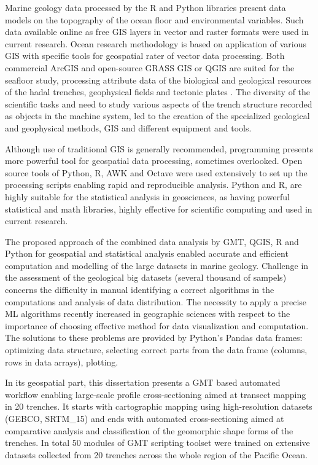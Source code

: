 \documentclass[11pt,a4paper]{report}
\begin{document}
Marine geology data processed by the R and Python libraries present data models on the topography of the ocean floor and environmental variables. Such data available online as free \ac{GIS} layers in vector and raster formats were used in current research. Ocean research methodology is based on application of various \ac{GIS} with specific tools for geospatial rater of vector data processing. Both commercial ArcGIS and open-source \ac{GRASS GIS} or \ac{QGIS} are suited for the seafloor study, processing attribute data of the biological and geological resources of the hadal trenches, geophysical fields and tectonic plates \cite{Lemenkova202016}. The diversity of the scientific tasks and need to study various aspects of the trench structure recorded as objects in the machine system, led to the creation of the specialized geological and geophysical methods, \ac{GIS} and different equipment and tools. 

Although use of traditional GIS is generally recommended, programming presents more powerful tool for geospatial data processing, sometimes overlooked. Open source tools of Python, R, AWK and Octave were used extensively to set up the processing scripts enabling rapid and reproducible analysis. Python and R, are highly suitable for the statistical analysis in geosciences, as having powerful statistical and math libraries, highly effective for scientific computing and used in current research. 

The proposed approach of the combined data analysis by \ac{GMT}, \ac{QGIS}, R and Python for geospatial and statistical analysis enabled accurate and efficient computation and modelling of the large datasets in marine geology. Challenge in the assessment of the geological big datasets (several thousand of sampels) concerns the difficulty in manual identifying a correct algorithms in the computations and analysis of data distribution. The necessity to apply a precise \ac{ML} algorithms recently increased in geographic sciences with respect to the importance of choosing effective method for data visualization and computation. The solutions to these problems are provided by Python's Pandas data frames: optimizing data structure, selecting correct parts from the data frame (columns, rows in data arrays), plotting. 

In its geospatial part, this dissertation presents a \ac{GMT} based automated workflow enabling large-scale profile cross-sectioning aimed at transect mapping in 20 trenches. It starts with cartographic mapping using high-resolution datasets (\ac{GEBCO}, SRTM\_15) and ends with automated cross-sectioning aimed at comparative analysis and classification of the geomorphic shape forms of the trenches. In total 50 modules of \ac{GMT} scripting toolset were trained on extensive datasets collected from 20 trenches across the whole region of the Pacific Ocean. 
\end{document}
